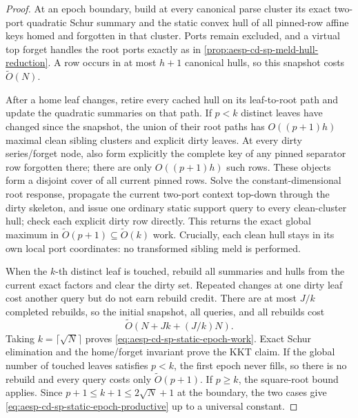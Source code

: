 \begin{proof}
At an epoch boundary, build at every canonical parse cluster its exact
two-port quadratic Schur summary and the static convex hull of all pinned-row
affine keys homed and forgotten in that cluster.  Ports remain excluded, and
a virtual top forget handles the root ports exactly as in
\cref{prop:aesp-cd-sp-meld-hull-reduction}.  A row occurs in at most \(h+1\)
canonical hulls, so this snapshot costs \(\widetilde O(N)\).

After a home leaf changes, retire every cached hull on its leaf-to-root path
and update the quadratic summaries on that path.  If \(p<k\) distinct leaves
have changed since the snapshot, the union of their root paths has
\(O((p+1)h)\) maximal clean sibling clusters and explicit dirty leaves.
At every dirty series/forget node, also form explicitly the complete key of
any pinned separator row forgotten there; there are only
\(O((p+1)h)\) such rows.  These objects form a disjoint cover of all current
pinned rows.  Solve the
constant-dimensional root response, propagate the current two-port context
top-down through the dirty skeleton, and issue one ordinary static support
query to every clean-cluster hull; check each explicit dirty row directly.
This returns the exact global maximum in \(\widetilde O(p+1)\subseteq
\widetilde O(k)\) work.  Crucially, each clean hull stays in its own local
port coordinates: no transformed sibling meld is performed.

When the \(k\)-th distinct leaf is touched, rebuild all summaries and hulls
from the current exact factors and clear the dirty set.  Repeated changes at
one dirty leaf cost another query but do not earn rebuild credit.  There are
at most \(J/k\) completed rebuilds, so the initial snapshot, all queries, and
all rebuilds cost
\begin{equation*}
 \widetilde O\!\left(N+Jk+(J/k)N\right).
\end{equation*}
Taking \(k=\lceil\sqrt N\rceil\) proves
\cref{eq:aesp-cd-sp-static-epoch-work}.  Exact Schur elimination and the
home/forget invariant prove the KKT claim.  If the global number of touched
leaves satisfies \(p<k\), the first epoch never fills, so there is no rebuild
and every query costs only \(\widetilde O(p+1)\).  If \(p\geq k\), the
square-root bound applies.  Since
\(p+1\leq k+1\leq2\sqrt N+1\) at the boundary, the two cases give
\cref{eq:aesp-cd-sp-static-epoch-productive} up to a universal constant.
\end{proof}

